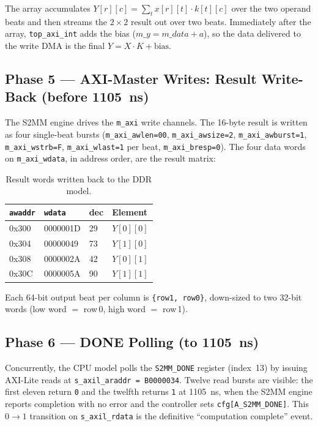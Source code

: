 The array accumulates $Y[r][c]=\sum_t x[r][t]\cdot k[t][c]$ over the two operand
beats and then streams the $2\times2$ result out over two beats. Immediately
after the array, \texttt{top\_axi\_int} adds the bias
($m\_y = m\_data + a$), so the data delivered to the write DMA is the final
$Y = X\cdot K + \text{bias}$.

\subsection{Phase 5 --- AXI-Master Writes: Result Write-Back (before \SI{1105}{ns})}

The S2MM engine drives the \texttt{m\_axi} write channels. The 16-byte result is
written as four single-beat bursts (\texttt{m\_axi\_awlen=00},
\texttt{m\_axi\_awsize=2}, \texttt{m\_axi\_awburst=1}, \texttt{m\_axi\_wstrb=F},
\texttt{m\_axi\_wlast=1} per beat, \texttt{m\_axi\_bresp=0}). The four data words
on \texttt{m\_axi\_wdata}, in address order, are the result matrix:

\begin{table}[h]
\centering
\begin{tabular}{llll}
\toprule
\texttt{awaddr} & \texttt{wdata} & dec & Element \\
\midrule
0x300 & 0000001D & 29 & $Y[0][0]$ \\
0x304 & 00000049 & 73 & $Y[1][0]$ \\
0x308 & 0000002A & 42 & $Y[0][1]$ \\
0x30C & 0000005A & 90 & $Y[1][1]$ \\
\bottomrule
\end{tabular}
\caption{Result words written back to the DDR model.}
\label{tab:writes}
\end{table}

Each 64-bit output beat per column is \texttt{\{row1,\,row0\}}, down-sized to two
32-bit words (low word $=$ row\,0, high word $=$ row\,1).

\subsection{Phase 6 --- DONE Polling (to \SI{1105}{ns})}

Concurrently, the CPU model polls the \texttt{S2MM\_DONE} register (index~13) by
issuing AXI-Lite reads at \texttt{s\_axil\_araddr = B0000034}. Twelve read bursts
are visible: the first eleven return \texttt{0} and the twelfth returns \texttt{1}
at \SI{1105}{ns}, when the S2MM engine reports completion with no error and the
controller sets \texttt{cfg[A\_S2MM\_DONE]}. This $0\rightarrow1$ transition on
\texttt{s\_axil\_rdata} is the definitive ``computation complete'' event.

